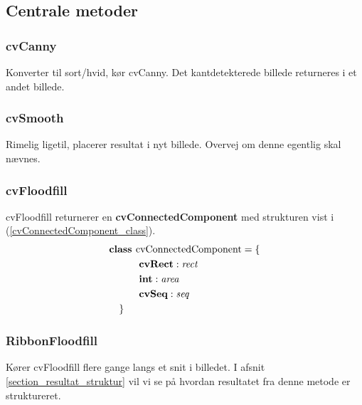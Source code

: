 {\subsection{Centrale metoder}
\subsubsection{cvCanny}
Konverter til sort/hvid, kør cvCanny. Det kantdetekterede billede
returneres i et andet billede.

\subsubsection{cvSmooth}
Rimelig ligetil, placerer resultat i nyt billede. Overvej om denne
egentlig skal nævnes.

\subsubsection{cvFloodfill}
cvFloodfill returnerer en \textbf{cvConnectedComponent} med strukturen
vist i (\ref{cvConnectedComponent_class}).
\begin{multline}
    \textbf{class~} \textrm{cvConnectedComponent} = \{ \\
    \shoveleft{\qquad\textbf{cvRect} : \textit{rect}} \\
    \shoveleft{\qquad\textbf{int} : \textit{area}} \\
    \shoveleft{\qquad\textbf{cvSeq} : \textit{seq}} \\
    \shoveleft{\}}\shoveright{}
    \label{cvConnectedComponent_class}
\end{multline}

\subsubsection{RibbonFloodfill}
Kører cvFloodfill flere gange langs et snit i billedet. I afsnit
\ref{section_resultat_struktur} vil vi se på hvordan resultatet fra
denne metode er struktureret.

}

